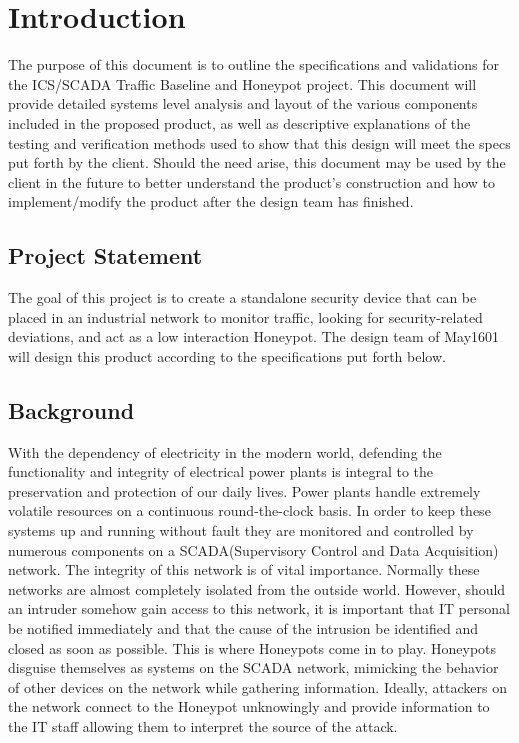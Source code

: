 \chapter{Introduction}

The purpose of this document is to outline the specifications and validations for the ICS/SCADA Traffic Baseline and Honeypot project. This document will provide detailed systems level analysis and layout of the various components included in the proposed product, as well as descriptive explanations of the testing and verification methods used to show that this design will meet the specs put forth by the client. Should the need arise, this document may be used by the client in the future to better understand the product's construction and how to implement/modify the product after the design team has finished.

\section{Project Statement}

 The goal of this project is to create a standalone security device that can be placed in an industrial network to monitor traffic, looking for security-related deviations, and act as a low interaction Honeypot. The design team of May1601 will design this product according to the specifications put forth below.

\section{Background}

With the dependency of electricity in the modern world, defending the functionality and integrity of electrical power plants is integral to the preservation and protection of our daily lives. Power plants handle extremely volatile resources on a continuous round-the-clock basis. In order to keep these systems up and running without fault they are monitored and controlled by numerous components on a SCADA(Supervisory Control and Data Acquisition) network. The integrity of this network is of vital importance. Normally these networks are almost completely isolated from the outside world. However, should an intruder somehow gain access to this network, it is important that IT personal be notified immediately and that the cause of the intrusion be identified and closed as soon as possible. This is where Honeypots come in to play. Honeypots disguise themselves as systems on the SCADA network, mimicking the behavior of other devices on the network while gathering information. Ideally, attackers on the network connect to the Honeypot unknowingly and provide information to the IT staff allowing them to interpret the source of the attack. 


